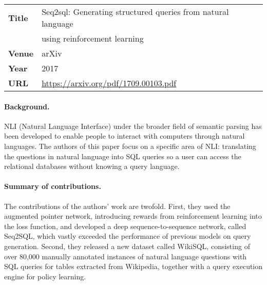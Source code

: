 
\begin{table}[h]
	\centering
	\begin{tabular}{ll}
		\toprule
		\textbf{Title} & Seq2sql: Generating structured queries from natural language \\
		               & using reinforcement learning                                 \\
		\midrule
		\textbf{Venue} & arXiv                                                        \\
		\textbf{Year}  & 2017                                                         \\
		\textbf{URL}   & \url{https://arxiv.org/pdf/1709.00103.pdf}                   \\
		\bottomrule
	\end{tabular}
	\vspace{1em}
\end{table}

\paragraph{Background.}
NLI (Natural Language Interface) under the broader field of semantic parsing
has been developed to enable people to interact with computers through natural
languages. The authors of this paper focus on a specific area of NLI:
translating the questions in natural language into SQL queries so a user can
access the relational databases without knowing a query language.

\paragraph{Summary of contributions.}
The contributions of the authors' work are twofold. First, they used the
augmented pointer network, introducing rewards from reinforcement learning
into the loss function, and developed a deep sequence-to-sequence network,
called Seq2SQL, which vastly exceeded the performance of previous models on
query generation. Second, they released a new dataset called WikiSQL,
consisting of over 80,000 manually annotated instances of natural language
questions with SQL queries for tables extracted from Wikipedia, together with a
query execution engine for policy learning.

